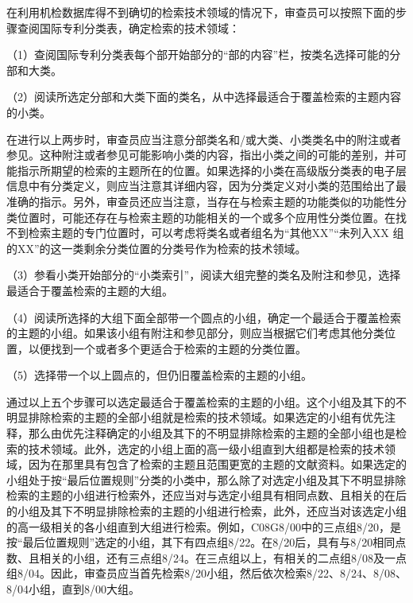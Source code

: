 在利用机检数据库得不到确切的检索技术领域的情况下，审查员可以按照下面的步骤查阅国际专利分类表，确定检索的技术领域：

{\setlength{\parindent}{17.1bp}（1）查阅国际专利分类表每个部开始部分的“部的内容”栏，按类名选择可能的分部和大类。\par}

{\setlength{\parindent}{17.1bp}（2）阅读所选定分部和大类下面的类名，从中选择最适合于覆盖检索的主题内容的小类。\par}

在进行以上两步时，审查员应当注意分部类名和/或大类、小类类名中的附注或者参见。这种附注或者参见可能影响小类的内容，指出小类之间的可能的差别，并可能指示所期望的检索的主题所在的位置。如果选择的小类在高级版分类表的电子层信息中有分类定义，则应当注意其详细内容，因为分类定义对小类的范围给出了最准确的指示。另外，审查员还应当注意，当存在与检索主题的功能类似的功能性分类位置时，可能还存在与检索主题的功能相关的一个或多个应用性分类位置。在找不到检索主题的专门位置时，可以考虑将类名或者组名为“其他XX”“未列入XX 组的XX”的这一类剩余分类位置的分类号作为检索的技术领域。

{\setlength{\parindent}{17.1bp}（3）参看小类开始部分的“小类索引”，阅读大组完整的类名及附注和参见，选择最适合于覆盖检索的主题的大组。\par}

{\setlength{\parindent}{17.1bp}（4）阅读所选择的大组下面全部带一个圆点的小组，确定一个最适合于覆盖检索的主题的小组。如果该小组有附注和参见部分，则应当根据它们考虑其他分类位置，以便找到一个或者多个更适合于检索的主题的分类位置。\par}

{\setlength{\parindent}{17.1bp}（5）选择带一个以上圆点的，但仍旧覆盖检索的主题的小组。\par}

通过以上五个步骤可以选定最适合于覆盖检索的主题的小组。这个小组及其下的不明显排除检索的主题的全部小组就是检索的技术领域。如果选定的小组有优先注释，那么由优先注释确定的小组及其下的不明显排除检索的主题的全部小组也是检索的技术领域。此外，选定的小组上面的高一级小组直到大组都是检索的技术领域，因为在那里具有包含了检索的主题且范围更宽的主题的文献资料。如果选定的小组处于按“最后位置规则”分类的小类中，那么除了对选定小组及其下不明显排除检索的主题的小组进行检索外，还应当对与选定小组具有相同点数、且相关的在后的小组及其下不明显排除检索的主题的小组进行检索，此外，还应当对该选定小组的高一级相关的各小组直到大组进行检索。例如，C08G8/00中的三点组8/20，是按“最后位置规则”选定的小组，其下有四点组8/22。在8/20后，具有与8/20相同点数、且相关的小组，还有三点组8/24。在三点组以上，有相关的二点组8/08及一点组8/04。因此，审查员应当首先检索8/20小组，然后依次检索8/22、8/24、8/08、8/04小组，直到8/00大组。

